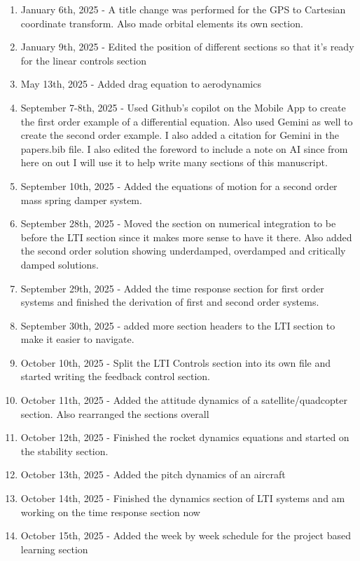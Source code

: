 \begin{enumerate}[itemsep=-5pt]
\item January 6th, 2025 - A title change was performed for the GPS to Cartesian coordinate transform. Also made orbital elements its own section.
\item January 9th, 2025 - Edited the position of different sections so that it's ready for the linear controls section
\item May 13th, 2025 - Added drag equation to aerodynamics
\item September 7-8th, 2025 - Used Github's copilot on the Mobile App to create the first order example of a differential equation. Also used Gemini as well to create the second order example. I also added a citation for Gemini in the papers.bib file. I also edited the foreword to include a note on AI since from here on out I will use it to help write many sections of this manuscript.
\item September 10th, 2025 - Added the equations of motion for a second order mass spring damper system.
\item September 28th, 2025 - Moved the section on numerical integration to be before the LTI section since it makes more sense to have it there. Also added the second order solution showing underdamped, overdamped and critically damped solutions.
\item September 29th, 2025 - Added the time response section for first order systems and finished the derivation of first and second order systems.
\item September 30th, 2025 - added more section headers to the LTI section to make it easier to navigate.
\item October 10th, 2025 - Split the LTI Controls section into its own file and started writing the feedback control section.
\item October 11th, 2025 - Added the attitude dynamics of a satellite/quadcopter section. Also rearranged the sections overall
\item October 12th, 2025 - Finished the rocket dynamics equations and started on the stability section.
\item October 13th, 2025 - Added the pitch dynamics of an aircraft
\item October 14th, 2025 - Finished the dynamics section of LTI systems and am working on the time response section now
\item October 15th, 2025 - Added the week by week schedule for the project based learning section
\end{enumerate}

